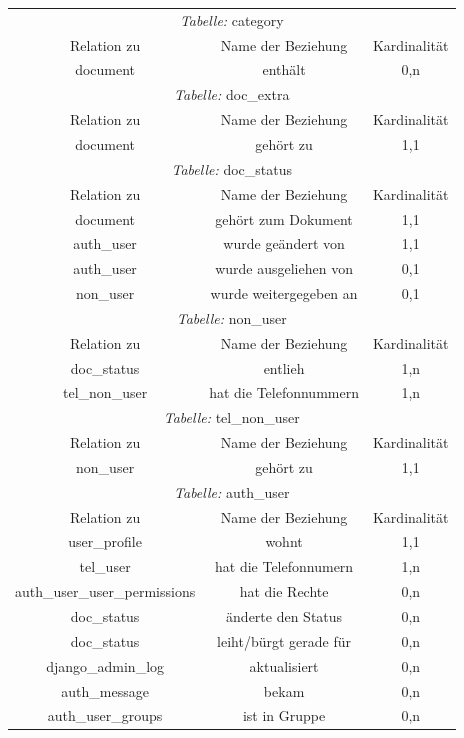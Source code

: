 \begin{longtable}{@{}ccc@{}}
  \toprule
  \multicolumn{3}{c}{\emph{Tabelle:} category} \\
  Relation zu & Name der Beziehung & Kardinalität \\
  \cmidrule(lr){1-1}\cmidrule(lr){2-2}\cmidrule(lr){3-3}
  document & enthält & 0,n \\

  \toprule
  \multicolumn{3}{c}{\emph{Tabelle:} doc\_extra} \\
  Relation zu & Name der Beziehung & Kardinalität \\
  \cmidrule(lr){1-1}\cmidrule(lr){2-2}\cmidrule(lr){3-3}
  document & gehört zu & 1,1 \\

  \toprule
  \multicolumn{3}{c}{\emph{Tabelle:} doc\_status} \\
  Relation zu & Name der Beziehung & Kardinalität \\
  \cmidrule(lr){1-1}\cmidrule(lr){2-2}\cmidrule(lr){3-3}
  document & gehört zum Dokument & 1,1\\
  auth\_user & wurde geändert von & 1,1\\
  auth\_user & wurde ausgeliehen von & 0,1\\
  non\_user & wurde weitergegeben an & 0,1\\

  \toprule
  \multicolumn{3}{c}{\emph{Tabelle:} non\_user} \\
  Relation zu & Name der Beziehung & Kardinalität \\
  \cmidrule(lr){1-1}\cmidrule(lr){2-2}\cmidrule(lr){3-3}
  doc\_status & entlieh & 1,n\\
  tel\_non\_user & hat die Telefonnummern & 1,n\\

  \toprule
  \multicolumn{3}{c}{\emph{Tabelle:} tel\_non\_user} \\
  Relation zu & Name der Beziehung & Kardinalität \\
  \cmidrule(lr){1-1}\cmidrule(lr){2-2}\cmidrule(lr){3-3}
  non\_user & gehört zu & 1,1 \\

  \toprule
  \multicolumn{3}{c}{\emph{Tabelle:} auth\_user} \\
  Relation zu & Name der Beziehung & Kardinalität \\
  \cmidrule(lr){1-1}\cmidrule(lr){2-2}\cmidrule(lr){3-3}
  user\_profile & wohnt & 1,1\\
  tel\_user & hat die Telefonnumern & 1,n\\
  auth\_user\_user\_permissions & hat die Rechte & 0,n\\
  doc\_status & änderte den Status & 0,n\\  
  doc\_status & leiht/bürgt gerade für & 0,n\\
  django\_admin\_log & aktualisiert & 0,n\\
  auth\_message & bekam & 0,n\\
  auth\_user\_groups & ist in Gruppe & 0,n\\


\end{longtable}
